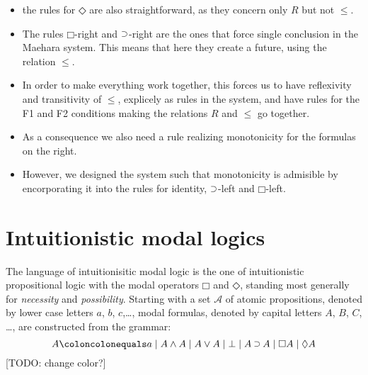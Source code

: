 \documentclass[a4paper]{article}
\theoremstyle{plain}
\theoremstyle{definition}
\newcommand{\todo}[1]{{\color{red}[TODO: #1]}}
\newcommand*{\AND}{\mathbin{\wedge}}
\newcommand*{\OR}{\mathbin{\vee}}
\newcommand*{\BOT}{\mathord{\bot}}
\newcommand*{\IMP}{\mathbin{\scalebox{.9}{\raise.2ex\hbox{$\supset$}}}}
\newcommand*{\BOX}{\mathord{\Box}}
\newcommand*{\DIA}{\mathord{\Diamond}}
\begin{document}
{\begin{itemize}
\begin{itemize}
      identity, but there is a subtlety; see below...
    \item the rules for $\DIA$ are also straightforward, as they
      concern only $R$ but not $\le$.
    \item The rules $\BOX$-right and $\IMP$-right are the ones that
      force single conclusion in the Maehara system. This means that
      here they create a future, using the relation $\le$.
    \item In order to make everything work together, this forces us to
      have reflexivity and transitivity of $\le$, explicely as rules
      in the system, and have rules for the F1 and F2 conditions
      making the relations $R$ and $\le$ go together.
    \item As a consequence we also need a rule realizing monotonicity
      for the formulas on the right.
    \item However, we designed the system such that monotonicity is
      admisible by encorporating it into the rules for identity,
      $\IMP$-left and $\BOX$-left.
    \end{itemize}
  \end{itemize}
}
%

%
%
\section{Intuitionistic modal logics}\label{sec:intmod}
The language of {intuitionisitic modal logic} is the one of intuitionistic propositional logic with the modal operators $\BOX$ and $\DIA$, standing most generally for \emph{necessity} and \emph{possibility}.
%
Starting with a set $\mathcal{A}$ of atomic propositions, denoted by lower case letters $a$, $b$, $c$,\ldots, modal formulas, denoted by capital letters $A$, $B$, $C$, \ldots, are constructed from the grammar:
%
$$
A \coloncolonequals
a \mid A \AND A \mid A \OR A \mid \BOT \mid A \IMP A \mid \BOX A \mid \DIA A
$$
%
\todo{change color?}
\end{document}

